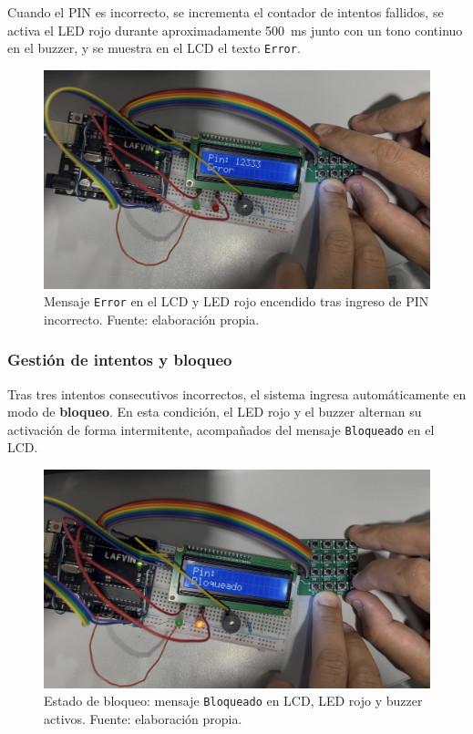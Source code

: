 Cuando el PIN es incorrecto, se incrementa el contador de intentos fallidos, 
se activa el LED rojo durante aproximadamente 500~ms junto con un tono continuo en el buzzer, 
y se muestra en el LCD el texto \texttt{Error}.  

\begin{figure}[H]
    \centering
    \includegraphics[width=0.7\columnwidth]{Anexos/Cerradura_Error.png}
    \caption{Mensaje \texttt{Error} en el LCD y LED rojo encendido tras ingreso de PIN incorrecto. Fuente: elaboración propia.}
    \label{fig:cerradura_error}
\end{figure}

\subsubsection{Gestión de intentos y bloqueo}

Tras tres intentos consecutivos incorrectos, el sistema ingresa automáticamente en modo de \textbf{bloqueo}.  
En esta condición, el LED rojo y el buzzer alternan su activación de forma intermitente, 
acompañados del mensaje \texttt{Bloqueado} en el LCD.  

\begin{figure}[H]
    \centering
    \includegraphics[width=0.7\columnwidth]{Anexos/Cerradura_Bloqueado.png}
    \caption{Estado de bloqueo: mensaje \texttt{Bloqueado} en LCD, LED rojo y buzzer activos. Fuente: elaboración propia.}
    \label{fig:cerradura_bloqueado}
\end{figure}

